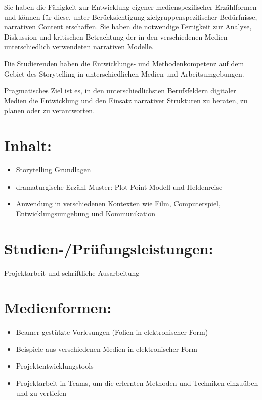 Sie haben die Fähigkeit zur Entwicklung eigener medienspezifischer
Erzählformen und können für diese, unter Berücksichtigung
zielgruppenspezifischer Bedürfnisse, narrativen Content erschaffen. Sie
haben die notwendige Fertigkeit zur Analyse, Diskussion und kritischen
Betrachtung der in den verschiedenen Medien unterschiedlich verwendeten
narrativen Modelle.

Die Studierenden haben die Entwicklungs- und Methodenkompetenz auf dem
Gebiet des Storytelling in unterschiedlichen Medien und
Arbeitsumgebungen.

Pragmatisches Ziel ist es, in den unterschiedlichsten Berufsfeldern
digitaler Medien die Entwicklung und den Einsatz narrativer Strukturen
zu beraten, zu planen oder zu verantworten.

\section*{Inhalt:}\label{inhalt-17}

\begin{itemize}
\item
  Storytelling Grundlagen
\item
  dramaturgische Erzähl-Muster: Plot-Point-Modell und Heldenreise
\item
  Anwendung in verschiedenen Kontexten wie Film, Computerspiel,
  Entwicklungsumgebung und Kommunikation
\end{itemize}

\section*{Studien-/Prüfungsleistungen:}\label{studien-pruxfcfungsleistungen-17}

Projektarbeit und schriftliche Ausarbeitung

\section*{Medienformen:}\label{medienformen-17}

\begin{itemize}
\item
  Beamer-gestützte Vorlesungen (Folien in elektronischer Form)
\item
  Beispiele aus verschiedenen Medien in elektronischer Form
\item
  Projektentwicklungstools
\item
  Projektarbeit in Teams, um die erlernten Methoden und Techniken
  einzuüben und zu vertiefen
\end{itemize}

